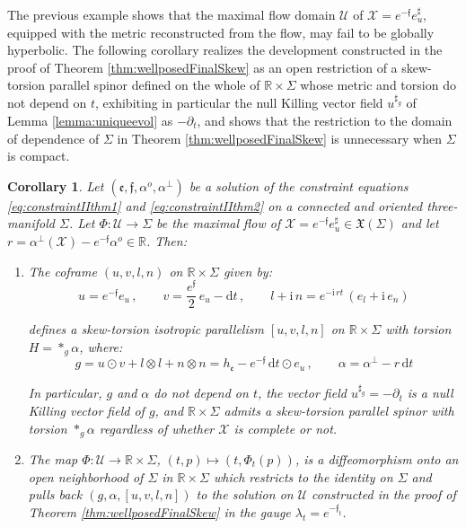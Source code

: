 \documentclass[10pt,reqno,a4paper]{amsart}
\theoremstyle{plain}
\newtheorem{cor}[thm]{Corollary}
\theoremstyle{definition}
\theoremstyle{remark}
\theoremstyle{remark}
\def\dd{\mathrm{d}}
\def\cX{\mathcal{X}}
\def\cU{\mathcal{U}}
\def\fre{\mathfrak{e}}
\renewcommand{\(}{ (}
\renewcommand{\)}{ )}
\newcommand{\frf}{\mathfrak{f}}
\begin{document}
\noindent
The previous example shows that the maximal flow domain $\cU$ of $\cX = e^{-\frf} e^{\sharp}_u$, equipped with the metric reconstructed from the flow, may fail to be globally hyperbolic. The following corollary realizes the development constructed in the proof of Theorem \ref{thm:wellposedFinalSkew} as an open restriction of a skew-torsion parallel spinor defined on the whole of $\mathbb{R}\times \Sigma$ whose metric and torsion do not depend on $t$, exhibiting in particular the null Killing vector field $u^{\sharp_g}$ of Lemma \ref{lemma:uniqueevol} as $-\partial_t$, and shows that the restriction to the domain of dependence of $\Sigma$ in Theorem \ref{thm:wellposedFinalSkew} is unnecessary when $\Sigma$ is compact.

\begin{cor}
\label{cor:timeindependentdevelopment}
Let $(\fre,\frf,\alpha^o,\alpha^{\perp})$ be a solution of the constraint equations \eqref{eq:constraintIIthm1} and \eqref{eq:constraintIIthm2} on a connected and oriented three-manifold $\Sigma$. Let $\Phi\colon \cU \to \Sigma$ be the maximal flow of $\cX = e^{-\frf} e^{\sharp}_u \in \mathfrak{X}(\Sigma)$ and let $r = \alpha^{\perp}(\cX) - e^{-\frf}\alpha^o \in \mathbb{R}$. Then:
\begin{enumerate}
\item The coframe $(u,v,l,n)$ on $\mathbb{R}\times \Sigma$ given by:
\begin{equation}
\label{eq:timeindependentcoframe}
u = e^{-\frf} e_u \, , \qquad v = \frac{e^{\frf}}{2}\, e_u - \dd t \, , \qquad l + \mathrm{i}\, n = e^{-\mathrm{i}\, r t}\, (e_l + \mathrm{i}\, e_n)
\end{equation}

\noindent
defines a skew-torsion isotropic parallelism $[u,v,l,n]$ on $\mathbb{R}\times \Sigma$ with torsion $H = \ast_g \alpha$, where:
\begin{equation}
\label{eq:timeindependentmetric}
g = u\odot v + l\otimes l + n\otimes n = h_{\fre} - e^{-\frf}\, \dd t \odot e_u \, , \qquad \alpha = \alpha^{\perp} - r\, \dd t
\end{equation}

\noindent
In particular, $g$ and $\alpha$ do not depend on $t$, the vector field $u^{\sharp_g} = -\partial_t$ is a null Killing vector field of $g$, and $\mathbb{R}\times\Sigma$ admits a skew-torsion parallel spinor with torsion $\ast_g\alpha$ regardless of whether $\cX$ is complete or not.

\item The map $\Phi\colon \cU \to \mathbb{R}\times\Sigma$, $(t,p)\mapsto (t,\Phi_t(p))$, is a diffeomorphism onto an open neighborhood of $\Sigma$ in $\mathbb{R}\times\Sigma$ which restricts to the identity on $\Sigma$ and pulls back $(g,\alpha,[u,v,l,n])$ to the solution on $\cU$ constructed in the proof of Theorem \ref{thm:wellposedFinalSkew} in the gauge $\lambda_t = e^{-\frf_t}$.  


\end{enumerate}
\end{cor}
\end{document}
